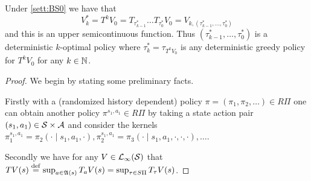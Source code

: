\begin{prop}
  Under \cref{sett:BS0} we have that
  \[ V^*_k = T^k V_0 = T_{\tau^*_{k-1}} \dots T_{\tau^*_0} V_0
  = V_{k, (\tau^*_{k-1}, \dots, \tau^*_0)} \]
  and this is an upper semicontinuous function.
  Thus $(\tau^*_{k-1}, \dots, \tau^*_0)$ is a deterministic
  $k$-optimal policy
  where $\tau_k^* = \tau_{T^k V_0}$ is any deterministic
  greedy policy for $T^k V_0$ for any $k \in \mathbb{N}$.
  \label{prop:kOpt}
\end{prop}
\begin{proof}
  We begin by stating some preliminary facts.

  Firstly with a (randomized history dependent)
  policy $\pi = (\pi_1, \pi_2, \dots) \in R\Pi$ one can obtain another policy
  $\pi^{s_1, a_1} \in R\Pi$ by taking a state action pair
  $(s_1, a_1) \in \mathcal{S} \times \mathcal{A}$ and consider the kernels
  $\pi_1^{s_1, a_1} = \pi_2(\cdot \mid s_1, a_1, \cdot), 
  \pi_2^{s_1, a_1} = \pi_3(\cdot \mid s_1, a_1, \cdot, \cdot, \cdot),
  \dots$.

  Secondly we have for any $V \in \mathcal{L}_\infty(\mathcal{S})$ that
  $TV(s) \stackrel{\mathrm{def}}{=} \sup_{a \in \frak{A}(s)} T_a V(s)
  = \sup_{\tau \in S\Pi} T_\tau V(s)$.


\end{proof}
